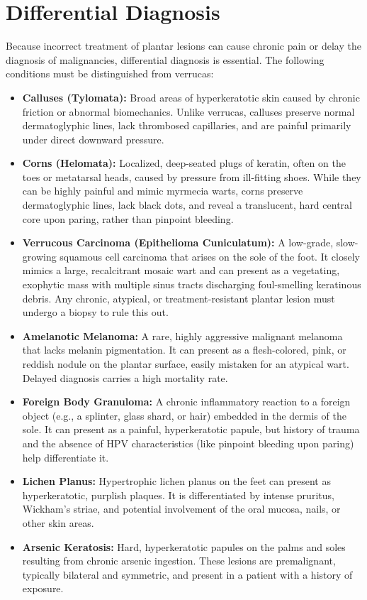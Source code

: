 \section*{Differential Diagnosis}
Because incorrect treatment of plantar lesions can cause chronic pain or delay the diagnosis of malignancies, differential diagnosis is essential. The following conditions must be distinguished from verrucas:
\begin{itemize}
    \item \textbf{Calluses (Tylomata):} Broad areas of hyperkeratotic skin caused by chronic friction or abnormal biomechanics. Unlike verrucas, calluses preserve normal dermatoglyphic lines, lack thrombosed capillaries, and are painful primarily under direct downward pressure.
    \item \textbf{Corns (Helomata):} Localized, deep-seated plugs of keratin, often on the toes or metatarsal heads, caused by pressure from ill-fitting shoes. While they can be highly painful and mimic myrmecia warts, corns preserve dermatoglyphic lines, lack black dots, and reveal a translucent, hard central core upon paring, rather than pinpoint bleeding.
    \item \textbf{Verrucous Carcinoma (Epithelioma Cuniculatum):} A low-grade, slow-growing squamous cell carcinoma that arises on the sole of the foot. It closely mimics a large, recalcitrant mosaic wart and can present as a vegetating, exophytic mass with multiple sinus tracts discharging foul-smelling keratinous debris. Any chronic, atypical, or treatment-resistant plantar lesion must undergo a biopsy to rule this out.
    \item \textbf{Amelanotic Melanoma:} A rare, highly aggressive malignant melanoma that lacks melanin pigmentation. It can present as a flesh-colored, pink, or reddish nodule on the plantar surface, easily mistaken for an atypical wart. Delayed diagnosis carries a high mortality rate.
    \item \textbf{Foreign Body Granuloma:} A chronic inflammatory reaction to a foreign object (e.g., a splinter, glass shard, or hair) embedded in the dermis of the sole. It can present as a painful, hyperkeratotic papule, but history of trauma and the absence of HPV characteristics (like pinpoint bleeding upon paring) help differentiate it.
    \item \textbf{Lichen Planus:} Hypertrophic lichen planus on the feet can present as hyperkeratotic, purplish plaques. It is differentiated by intense pruritus, Wickham's striae, and potential involvement of the oral mucosa, nails, or other skin areas.
    \item \textbf{Arsenic Keratosis:} Hard, hyperkeratotic papules on the palms and soles resulting from chronic arsenic ingestion. These lesions are premalignant, typically bilateral and symmetric, and present in a patient with a history of exposure.
\end{itemize}

